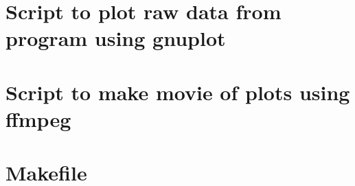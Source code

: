 \section{Script to plot raw data from program using gnuplot}



\section{Script to make movie of plots using ffmpeg}



\section{Makefile}






